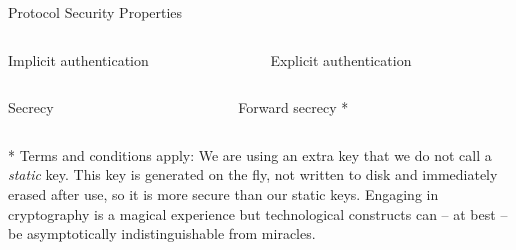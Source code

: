 \begin{frame}[T,s]{Protocol Security Properties}
  \small
  \begin{columns}[t,fullwidth]
  \hfill
    \begin{column}{.45\linewidth}
      \begin{block}{Implicit authentication}
      \end{block}
    \end{column}
    \hfill
    \begin{column}{.45\linewidth}
      \begin{block}{Explicit authentication}
      \end{block}
    \end{column}
    \hfill
  \end{columns}

	\bigskip
  \begin{columns}[t,fullwidth]
  \hfill
    \begin{column}{.45\linewidth}
      \begin{block}{Secrecy}
      \end{block}
    \end{column}
    \hfill
    \begin{column}{.45\linewidth}
      \begin{block}{Forward secrecy}
        *
      \end{block}
    \end{column}
    \hfill
  \end{columns}

  \vspace{1.5em}
  \footnotesize
  * Terms and conditions apply: We are using an extra key that we do not call a \emph{static} key. This key is generated on the fly,
  not written to disk and immediately erased after use, so it is more secure than our static keys. Engaging in cryptography is a magical
  experience but technological constructs can – at best – be asymptotically indistinguishable from miracles.

\end{frame}



